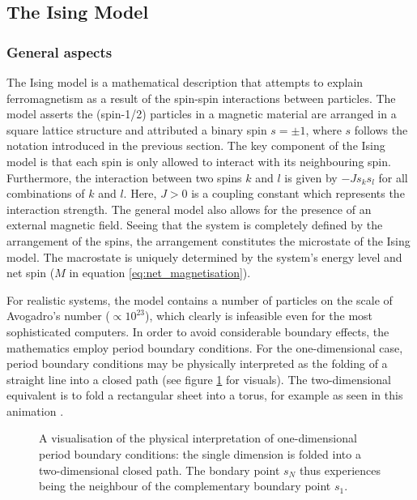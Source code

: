 \documentclass[nofootinbib,reprint,english]{revtex4-1}
\begin{document}
\subsection{The Ising Model}
\subsubsection{General aspects}
The Ising model is a mathematical description that attempts to explain ferromagnetism as a result of the spin-spin interactions between particles. The model asserts the (spin-1/2) particles in a magnetic material are arranged in a square lattice structure and attributed a binary spin \(s=\pm1\), where \(s\) follows the notation introduced in the previous section. The key component of the Ising model is that each spin is only allowed to interact with its neighbouring spin. Furthermore, the interaction between two spins \(k\) and \(l\) is given by \(-Js_ks_l\) for all combinations of \(k\) and \(l\). Here, \(J>0\) is a coupling constant which represents the interaction strength. The general model also allows for the presence of an external magnetic field. Seeing that the system is completely defined by the arrangement of the spins, the arrangement constitutes the microstate of the Ising model. The macrostate is uniquely determined by the system's energy level and net spin (\(M\) in equation \eqref{eq:net_magnetisation}).

For realistic systems, the model contains a number of particles on the scale of Avogadro's number (\(\propto10^{23}\)), which clearly is infeasible even for the most sophisticated computers. In order to avoid considerable boundary effects, the mathematics employ period boundary conditions. For the one-dimensional case, period boundary conditions may be physically interpreted as the folding of a straight line into a closed path (see figure \ref{fig:one_dimensional_boundary_conditions} for visuals). The two-dimensional equivalent is to fold a rectangular sheet into a torus, for example as seen in this animation \cite{animation}.

\begin{figure}
\centering
{}
\caption{A visualisation of the physical interpretation of one-dimensional period boundary conditions: the single dimension is folded into a two-dimensional closed path. The bondary point \(s_N\) thus experiences being the neighbour of the complementary boundary point \(s_1\).}\label{fig:one_dimensional_boundary_conditions}
\end{figure}
\end{document}
